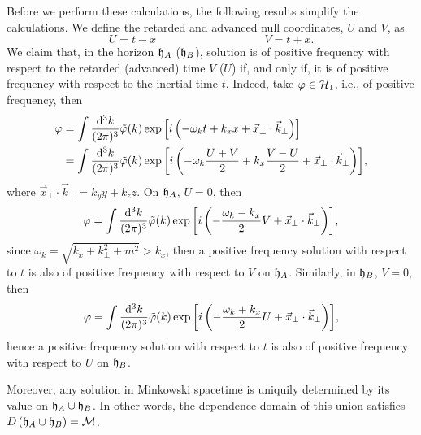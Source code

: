 Before we perform these calculations, the following results simplify the calculations. We define the retarded and advanced null coordinates, \(U\) and \(V\), as
\begin{equation}
    U=t-x\hspace{4cm}V=t+x.
\end{equation}
We claim that, in the horizon \({\mathfrak{h}}_A\) (\({\mathfrak{h}}_B\)), solution is of positive frequency with respect to the retarded (advanced) time \(V\) (\(U\)) if, and only if, it is of positive frequency with respect to the inertial time \(t\). Indeed, take \(\varphi\in{\mathcal{H}}_1\), i.e., of positive frequency, then
\begin{subequations}
    \begin{align}
        \varphi&=\int\frac{\mathrm{d}^3k}{(2\pi)^3}\tilde{\varphi}(k)\exp{\left[i\left(-\omega_k t+k_xx+\vec{x}_\perp\cdot\vec{k}_\perp\right)\right]}\\
        &=\int\frac{\mathrm{d}^3k}{(2\pi)^3}\tilde{\varphi}(k)\exp{\left[i\left(-\omega_k\frac{U+V}{2}+k_x\frac{V-U}{2}+\vec{x}_\perp\cdot\vec{k}_\perp\right)\right]},
    \end{align}
\end{subequations}
where \(\vec{x}_\perp\cdot\vec{k}_\perp=k_yy+k_zz\). On \({\mathfrak{h}}_A\), \(U=0\), then
\begin{equation}
    \varphi=\int\frac{\mathrm{d}^3k}{(2\pi)^3}\tilde{\varphi}(k)\exp{\left[i\left(-\frac{\omega_k-k_x}{2}V+\vec{x}_\perp\cdot\vec{k}_\perp\right)\right]},
\end{equation}
since \(\omega_k=\sqrt{k_x+k_\perp^2+m^2}>k_x\), then a positive frequency solution with respect to \(t\) is also of positive frequency with respect to \(V\) on \({\mathfrak{h}}_A\). Similarly, in \({\mathfrak{h}}_B\), \(V=0\), then
\begin{equation}
    \varphi=\int\frac{\mathrm{d}^3k}{(2\pi)^3}\tilde{\varphi}(k)\exp{\left[i\left(-\frac{\omega_k+k_x}{2}U+\vec{x}_\perp\cdot\vec{k}_\perp\right)\right]},
\end{equation}
hence a positive frequency solution with respect to \(t\) is also of positive frequency with respect to \(U\) on \({\mathfrak{h}}_B\).

Moreover, any solution in Minkowski spacetime is uniquily determined by its value on \({\mathfrak{h}}_A\cup{\mathfrak{h}}_B\). In other words, the dependence domain of this union satisfies \(D\left({\mathfrak{h}}_A\cup{\mathfrak{h}}_B\right)={\mathcal{M}}\).

